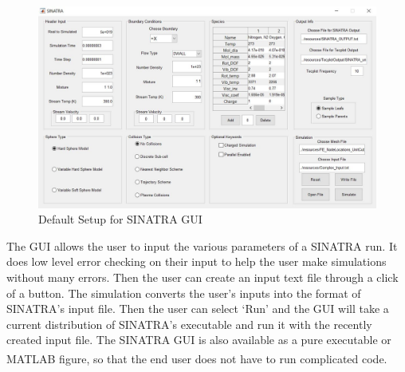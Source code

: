 \begin{figure}
\includegraphics[width=.95\textwidth]{figures/SINATRA_GUI.JPG}
\centering
\caption{Default Setup for SINATRA GUI}
\label{fig:SinatraGUI}
\end{figure}


\indent The GUI allows the user to input the various parameters of a SINATRA run. It does low level error checking on their input to help the user make simulations without many errors. Then the user can create an input text file through a click of a button. The simulation converts the user's inputs into the format of SINATRA's input file. Then the user can select `Run' and the GUI will take a current distribution of SINATRA's executable and run it with the recently created input file. The SINATRA GUI is also available as a pure executable or MATLAB\textsuperscript{\textregistered} figure, so that the end user does not have to run complicated code. 


